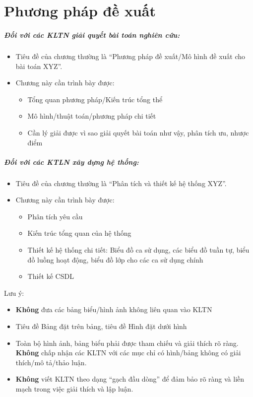 


\chapter{Phương pháp đề xuất}

\paragraph{Đối với các KLTN giải quyết bài toán nghiên cứu:}

\begin{itemize}
    \item Tiêu đề của chương thường là ``Phương pháp đề xuất/Mô hình đề xuất cho bài toán XYZ''. 
    \item Chương này cần trình bày được:
    \begin{itemize}
        \item Tổng quan phương pháp/Kiến trúc tổng thể
        \item Mô hình/thuật toán/phương pháp chi tiết
        \item Cần lý giải được vì sao giải quyết bài toán như vậy, phân tích ưu, nhược điểm 
    \end{itemize}
\end{itemize}

\paragraph{Đối với các KTLN xây dựng hệ thống:}
\begin{itemize}
    \item Tiêu đề của chương thường là ``Phân tích và thiết kế hệ thống XYZ''.
    \item Chương này cần trình bày được:
    \begin{itemize}
        \item Phân tích yêu cầu
        \item Kiến trúc tổng quan của hệ thống
        \item Thiết kế hệ thống chi tiết: Biểu đồ ca sử dụng, các biểu đồ tuần tự, biểu đồ luồng hoạt động, biểu đồ lớp cho các ca sử dụng chính
        \item Thiết kế CSDL
    \end{itemize}
\end{itemize}

Lưu ý:
\begin{itemize}
    \item \textbf{Không} đưa các bảng biểu/hình ảnh không liên quan vào KLTN
    \item Tiêu đề Bảng đặt trên bảng, tiêu đề Hình đặt dưới hình
    \item Toàn bộ hình ảnh, bảng biểu phải được tham chiếu và giải thích rõ ràng. \textbf{Không} chấp nhận các KLTN với các mục chỉ có hình/bảng không có giải thích/mô tả/thảo luận. 
    \item \textbf{Không} viết KLTN theo dạng ``gạch đầu dòng'' để đảm bảo rõ ràng và liền mạch trong việc giải thích và lập luận.
\end{itemize}